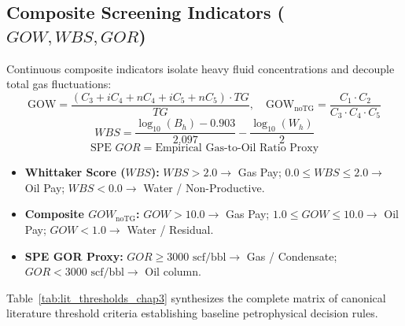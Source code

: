 \subsection{Composite Screening Indicators ($GOW, WBS, GOR$) \citep{whittaker1991, spe2020}}
Continuous composite indicators isolate heavy fluid concentrations and decouple total gas fluctuations:
\begin{equation}
    \text{GOW} = \frac{(C_3 + iC_4 + nC_4 + iC_5 + nC_5) \cdot TG}{TG}, \quad \text{GOW}_{\text{noTG}} = \frac{C_1 \cdot C_2}{C_3 \cdot C_4 \cdot C_5}
\end{equation}
\begin{equation}
    WBS = \frac{\log_{10}(B_h) - 0.903}{2.097} - \frac{\log_{10}(W_h)}{2}
\end{equation}
\begin{equation}
    \text{SPE } GOR = \text{Empirical Gas-to-Oil Ratio Proxy}
\end{equation}
\begin{itemize}
    \item \textbf{Whittaker Score ($WBS$):} $WBS > 2.0 \rightarrow$ Gas Pay; $0.0 \le WBS \le 2.0 \rightarrow$ Oil Pay; $WBS < 0.0 \rightarrow$ Water / Non-Productive.
    \item \textbf{Composite $GOW_{\text{noTG}}$:} $GOW > 10.0 \rightarrow$ Gas Pay; $1.0 \le GOW \le 10.0 \rightarrow$ Oil Pay; $GOW < 1.0 \rightarrow$ Water / Residual.
    \item \textbf{SPE GOR Proxy:} $GOR \ge 3000\text{ scf/bbl} \rightarrow$ Gas / Condensate; $GOR < 3000\text{ scf/bbl} \rightarrow$ Oil column.
\end{itemize}

Table~\ref{tab:lit_thresholds_chap3} synthesizes the complete matrix of canonical literature threshold criteria establishing baseline petrophysical decision rules.

